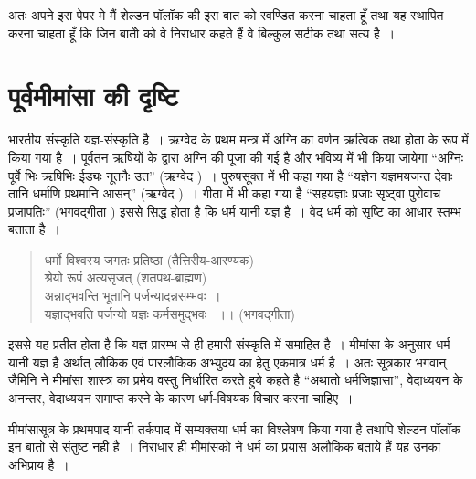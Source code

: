 अतः अपने इस पेपर मे मैं शेल्डन पॉलॉक की इस बात को रवण्डित करना चाहता हूँ तथा यह स्थापित करना चाहता हूँ कि जिन बातोें को वे निराधार कहते हैं वे बिल्कुल सटीक तथा सत्य है~।


\section*{पूर्वमीमांसा की दृष्टि}

भारतीय संस्कृति यज्ञ-संस्कृति है~। ऋग्वेद के प्रथम मन्त्र में अग्नि का वर्णन ऋत्विक तथा होता के रूप में किया गया है~। पूर्वतन ऋषियों के द्वारा अग्नि की पूजा की गई है और भविष्य में भी किया जायेगा “अग्निः पूर्वे भिः ऋषिभिः ईड्यः नूतनैः उत” (ऋग्वेद )~। पुरुषसूक्त में भी कहा गया है “यज्ञेन यज्ञमयजन्त देवाः तानि धर्माणि प्रथमानि आसन्” (ऋग्वेद )~। गीता में भी कहा गया है “सहयज्ञाः प्रजाः सृष्ट्वा पुरोवाच प्रजापतिः” (भगवद्गीता ) इससे सिद्ध होता है कि धर्म यानी यज्ञ है~। वेद धर्म को सृष्टि का आधार स्तम्भ बताता है~।

\smallskip

\begin{verse}
धर्मो विश्वस्य जगतः प्रतिष्ठा (तैत्तिरीय-आरण्यक)\\ श्रेयो रूपं अत्यसृजत् (शतपथ-ब्राह्मण)\\अन्नाद्भवन्ति भूतानि पर्जन्यादन्नसम्भवः~।\\यज्ञाद्भवति पर्जन्यो यज्ञः कर्मसमुद्भवः ~।। (भगवद्गीता)
\end{verse}

\smallskip

इससे यह प्रतीत होता है कि यज्ञ प्रारम्भ से ही हमारी संस्कृति में समाहित है~। मीमांसा के अनुसार धर्म यानी यज्ञ है अर्थात् लौकिक एवं पारलौकिक अभ्युदय का हेतु एकमात्र धर्म है~। अतः सूत्रकार भगवान् जैमिनि ने मीमांसा शास्त्र का प्रमेय वस्तु निर्धारित करते हुये कहते है “अथातो धर्मजिज्ञासा”, वेदाध्ययन के अनन्तर, वेदाध्ययन समाप्त करने के कारण धर्म-विषयक विचार करना चाहिए~।

मीमांसासूत्र के प्रथमपाद यानी तर्कपाद में सम्यक्तया धर्म का विश्लेषण किया गया है तथापि शेल्डन पॉलॉक इन बातो से संतुष्ट नही है~। निराधार ही मीमांसको ने धर्म का प्रयास अलौकिक बताये हैं यह उनका अभिप्राय है~।
\begin{myquote}

~\hfill {}
\end{myquote}


